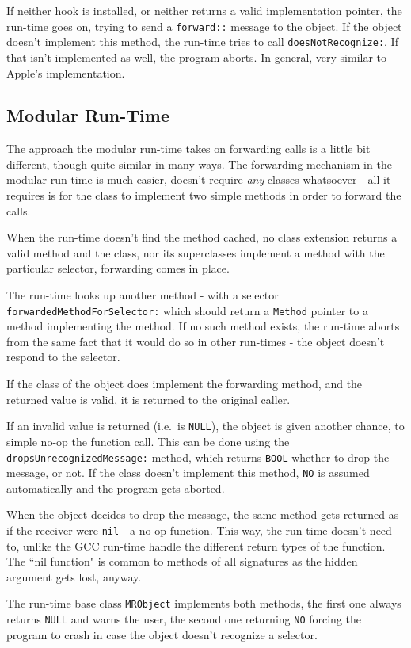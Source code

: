If neither hook is installed, or neither returns a valid implementation pointer, the run-time goes on, trying to send a \verb=forward::= message to the object. If the object doesn't implement this method, the run-time tries to call \verb=doesNotRecognize:=. If that isn't implemented as well, the program aborts. In general, very similar to Apple's implementation.

\subsection{Modular Run-Time}
 
The approach the modular run-time takes on forwarding calls is a little bit different, though quite similar in many ways. The forwarding mechanism in the modular run-time is much easier, doesn't require \emph{any} classes whatsoever - all it requires is for the class to implement two simple methods in order to forward the calls.

When the run-time doesn't find the method cached, no class extension returns a valid method and the class, nor its superclasses implement a method with the particular selector, forwarding comes in place.

The run-time looks up another method - with a selector \verb=forwardedMethodForSelector:= which should return a \verb=Method= pointer to a method implementing the method. If no such method exists, the run-time aborts from the same fact that it would do so in other run-times - the object doesn't respond to the selector.

If the class of the object does implement the forwarding method, and the returned value is valid, it is returned to the original caller.

If an invalid value is returned (i.e.\ is \verb=NULL=), the object is given another chance, to simple no-op the function call. This can be done using the \verb=dropsUnrecognizedMessage:= method, which returns \verb=BOOL= whether to drop the message, or not. If the class doesn't implement this method, \verb=NO= is assumed automatically and the program gets aborted.

When the object decides to drop the message, the same method gets returned as if the receiver were \verb=nil= - a no-op function. This way, the run-time doesn't need to, unlike the GCC run-time handle the different return types of the function. The ``nil function" is common to methods of all signatures as the hidden argument gets lost, anyway.

The run-time base class \verb=MRObject= implements both methods, the first one always returns \verb=NULL= and warns the user, the second one returning \verb=NO= forcing the program to crash in case the object doesn't recognize a selector.

